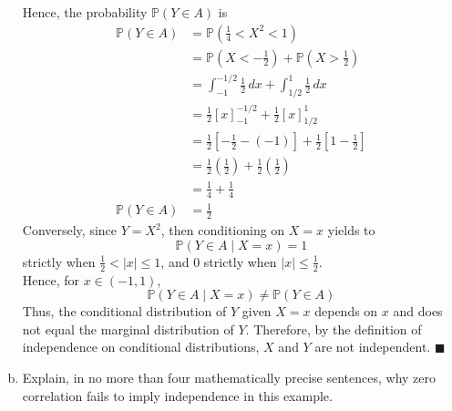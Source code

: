 \documentclass[letterpaper,12pt]{article}
\begin{document}
\begin{enumerate}[(a)]
\begin{list}{}{}
        Hence, the probability $\mathbb{P}(Y \in A)$ is
        \begin{align*}
        \mathbb{P}(Y \in A) &= \mathbb{P}\left(\frac{1}{4} < X^2 < 1\right) \\
        &= \mathbb{P}\left(X < -\frac{1}{2}\right) + \mathbb{P}\left(X > \frac{1}{2}\right) \\
        &= \int_{-1}^{-1/2} \frac{1}{2} \, dx + \int_{1/2}^{1} \frac{1}{2} \, dx \\
        &= \frac{1}{2}[x]_{-1}^{-1/2} + \frac{1}{2}[x]_{1/2}^{1} \\
        &= \frac{1}{2} \left[ -\frac{1}{2} - (-1) \right] + \frac{1}{2} \left[ 1 - \frac{1}{2} \right] \\
        &= \frac{1}{2}\left(\frac{1}{2}\right) + \frac{1}{2}\left(\frac{1}{2}\right) \\
        &= \frac{1}{4} + \frac{1}{4} \\
         \mathbb{P}(Y \in A) &= \frac{1}{2}
        \end{align*}
       Conversely, since $Y=X^2$, then conditioning on $X=x$ yields to
       \[ \mathbb{P}(Y \in A \mid X=x) = 1\] 
       strictly when $\frac{1}{2} < |x| \le 1$, and $0$ strictly when $|x| \le \frac{1}{2}$.\\
        Hence, for $x \in (-1,1)$,
        \[        \mathbb{P}(Y \in A \mid X=x) \neq \mathbb{P}(Y \in A)        \]
        Thus, the conditional distribution of $Y$ given $X = x$ depends on $x$ and does not equal the marginal distribution of $Y$. 
        Therefore, by the definition of independence on conditional distributions, $X$ and $Y$ are not independent. \hfill $\blacksquare$
    \end{list}
    \item Explain, in no more than four mathematically precise sentences, why zero correlation fails to imply independence in this example.
    \vspace{0.5em}
\end{enumerate}
\end{document}

